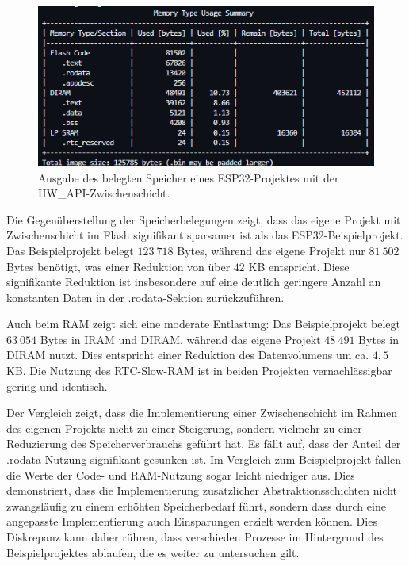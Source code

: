 \begin{figure}[H]
	\includegraphics[width=\textwidth]{Pics/esp32c6_hw_api_debug_size_detail.png}
	\caption{Ausgabe des belegten Speicher eines ESP32-Projektes mit der HW\_API-Zwischenschicht.}
	\label{fig:esp32_hw_api_size}
\end{figure}

Die Gegenüberstellung der Speicherbelegungen zeigt, dass das eigene Projekt mit Zwischenschicht im Flash signifikant sparsamer ist als das ESP32-Beispielprojekt. Das Beispielprojekt belegt $123\ 718$ Bytes, während das eigene Projekt nur $81\ 502$ Bytes benötigt, was einer Reduktion von über $42$ KB entspricht. 
Diese signifikante Reduktion ist insbesondere auf eine deutlich geringere Anzahl an konstanten Daten in der .rodata-Sektion zurückzuführen.

Auch beim RAM zeigt sich eine moderate Entlastung: Das Beispielprojekt belegt $63\ 054$ Bytes in IRAM und DIRAM, während das eigene Projekt $48\ 491$ Bytes in DIRAM nutzt. Dies entspricht einer Reduktion des Datenvolumens um ca. $4,5$ KB. 
Die Nutzung des RTC-Slow-RAM ist in beiden Projekten vernachlässigbar gering und identisch.

Der Vergleich zeigt, dass die Implementierung einer Zwischenschicht im Rahmen des eigenen Projekts nicht zu einer Steigerung, sondern vielmehr zu einer Reduzierung des Speicherverbrauchs geführt hat.
Es fällt auf, dass der Anteil der .rodata-Nutzung signifikant gesunken ist. 
Im Vergleich zum Beispielprojekt fallen die Werte der Code- und RAM-Nutzung sogar leicht niedriger aus. 
Dies demonstriert, dass die Implementierung zusätzlicher Abstraktionsschichten nicht zwangsläufig zu einem erhöhten Speicherbedarf führt, sondern dass durch eine angepasste Implementierung auch Einsparungen erzielt werden können.
Dies Diskrepanz kann daher rühren, dass verschieden Prozesse im Hintergrund des Beispielprojektes ablaufen, die es weiter zu untersuchen gilt.

